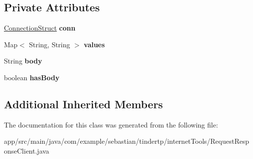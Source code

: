 \subsection*{Private Attributes}
\begin{DoxyCompactItemize}
\item 
\hyperlink{classcom_1_1example_1_1sebastian_1_1tindertp_1_1commonTools_1_1ConnectionStruct}{Connection\+Struct} {\bfseries conn}\hypertarget{classcom_1_1example_1_1sebastian_1_1tindertp_1_1internetTools_1_1RequestResponseClient_aee8a2b9d499b1472e1f9f5fac0adf59a}{}\label{classcom_1_1example_1_1sebastian_1_1tindertp_1_1internetTools_1_1RequestResponseClient_aee8a2b9d499b1472e1f9f5fac0adf59a}

\item 
Map$<$ String, String $>$ {\bfseries values}\hypertarget{classcom_1_1example_1_1sebastian_1_1tindertp_1_1internetTools_1_1RequestResponseClient_a8a1a9986d59973613123e7a172f706ac}{}\label{classcom_1_1example_1_1sebastian_1_1tindertp_1_1internetTools_1_1RequestResponseClient_a8a1a9986d59973613123e7a172f706ac}

\item 
String {\bfseries body}\hypertarget{classcom_1_1example_1_1sebastian_1_1tindertp_1_1internetTools_1_1RequestResponseClient_abfab1fba905477aed795365bb366e278}{}\label{classcom_1_1example_1_1sebastian_1_1tindertp_1_1internetTools_1_1RequestResponseClient_abfab1fba905477aed795365bb366e278}

\item 
boolean {\bfseries has\+Body}\hypertarget{classcom_1_1example_1_1sebastian_1_1tindertp_1_1internetTools_1_1RequestResponseClient_a359a4c1f0aaddd2eb2fc734d55043d8c}{}\label{classcom_1_1example_1_1sebastian_1_1tindertp_1_1internetTools_1_1RequestResponseClient_a359a4c1f0aaddd2eb2fc734d55043d8c}

\end{DoxyCompactItemize}
\subsection*{Additional Inherited Members}


The documentation for this class was generated from the following file\+:\begin{DoxyCompactItemize}
\item 
app/src/main/java/com/example/sebastian/tindertp/internet\+Tools/Request\+Response\+Client.\+java\end{DoxyCompactItemize}

